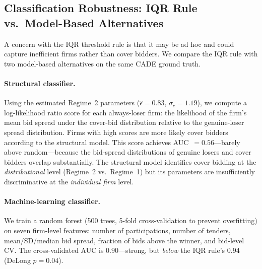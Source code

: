 
\subsection{Classification Robustness: IQR Rule vs.\ Model-Based Alternatives}
\label{sec:classification_robustness}

A concern with the IQR threshold rule is that it may be ad hoc and
could capture inefficient firms rather than cover bidders. We compare
the IQR rule with two model-based alternatives on the same CADE
ground truth.

\paragraph{Structural classifier.}
Using the estimated Regime~2 parameters ($\hat{\epsilon} = 0.83$,
$\hat{\sigma}_c = 1.19$), we compute a log-likelihood ratio score for
each always-loser firm: the likelihood of the firm's mean bid spread
under the cover-bid distribution relative to the genuine-loser spread
distribution. Firms with high scores are more likely cover bidders
according to the structural model. This score achieves
AUC~$= 0.56$---barely above random---because the bid-spread
distributions of genuine losers and cover bidders overlap
substantially. The structural model identifies cover bidding at the
\emph{distributional} level (Regime~2 vs.\ Regime~1) but its
parameters are insufficiently discriminative at the \emph{individual
firm} level.

\paragraph{Machine-learning classifier.}
We train a random forest (500 trees, 5-fold cross-validation to
prevent overfitting) on seven firm-level features: number of
participations, number of tenders, mean/SD/median bid spread,
fraction of bids above the winner, and bid-level CV. The
cross-validated AUC is $0.90$---strong, but \emph{below} the IQR
rule's $0.94$ (DeLong $p = 0.04$).

